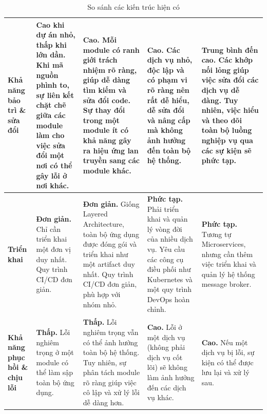 \begin{landscape}
\begin{table}[h!]
\begin{tabularx}{\linewidth}{|l|X|X|X|X|}
            \hline
            \textbf{Khả năng bảo trì \& sửa đổi}    & \textbf{Cao khi dự án nhỏ, thấp khi lớn dần.} Khi mã nguồn phình to, sự liên kết chặt chẽ giữa các module làm cho việc sửa đổi một nơi có thể gây lỗi ở nơi khác. & \textbf{Cao.} Mỗi module có ranh giới trách nhiệm rõ ràng, giúp dễ dàng tìm kiếm và sửa đổi code. Sự thay đổi trong một module ít có khả năng gây ra hiệu ứng lan truyền sang các module khác.                                              & \textbf{Cao.} Các dịch vụ nhỏ, độc lập và có phạm vi rõ ràng nên rất dễ hiểu, dễ sửa đổi và nâng cấp mà không ảnh hưởng đến toàn bộ hệ thống.                   & \textbf{Trung bình đến cao.} Các khớp nối lỏng giúp việc sửa đổi các dịch vụ dễ dàng. Tuy nhiên, việc hiểu và theo dõi toàn bộ luồng nghiệp vụ qua các sự kiện sẽ phức tạp. \\
            \hline
            \textbf{Triển khai}                     & \textbf{Đơn giản.} Chỉ cần triển khai một đơn vị duy nhất. Quy trình CI/CD đơn giản.                                                                              & \textbf{Đơn giản.} Giống Layered Architecture, toàn bộ ứng dụng được đóng gói và triển khai như một artifact duy nhất. Quy trình CI/CD đơn giản, phù hợp với nhóm nhỏ.                                                                      & \textbf{Phức tạp.} Phải triển khai và quản lý vòng đời của nhiều dịch vụ. Yêu cầu các công cụ điều phối như Kubernetes và một quy trình DevOps hoàn chỉnh.      & \textbf{Phức tạp.} Tương tự Microservices, nhưng cần thêm việc triển khai và quản lý hệ thống message broker.                                                               \\
            \hline
            \textbf{Khả năng phục hồi \& chịu lỗi}  & \textbf{Thấp.} Lỗi nghiêm trọng ở một module có thể làm sập toàn bộ ứng dụng.                                                                                     & \textbf{Thấp.} Lỗi nghiêm trọng vẫn có thể ảnh hưởng toàn bộ hệ thống. Tuy nhiên, sự phân tách module rõ ràng giúp việc cô lập và xử lý lỗi dễ dàng hơn.                                                 & \textbf{Cao.} Lỗi ở một dịch vụ (không phải dịch vụ cốt lõi) sẽ không làm ảnh hưởng đến các dịch vụ khác.                                                       & \textbf{Cao.} Nếu một dịch vụ bị lỗi, sự kiện có thể được lưu lại và xử lý sau.            \\
            \hline
        \end{tabularx}
        \caption{So sánh các kiến trúc hiện có}
        \label{tab:architecture_comparison}
    \end{table}
\end{landscape}

